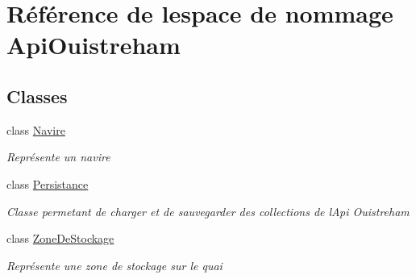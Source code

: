 \hypertarget{namespace_api_ouistreham}{}\section{Référence de l\textquotesingle{}espace de nommage Api\+Ouistreham}
\label{namespace_api_ouistreham}
\subsection*{Classes}
\begin{DoxyCompactItemize}
\item 
class \hyperlink{class_api_ouistreham_1_1_navire}{Navire}
\begin{DoxyCompactList}\small\item\em Représente un navire \end{DoxyCompactList}\item 
class \hyperlink{class_api_ouistreham_1_1_persistance}{Persistance}
\begin{DoxyCompactList}\small\item\em Classe permetant de charger et de sauvegarder des collections de l\textquotesingle{}Api Ouistreham \end{DoxyCompactList}\item 
class \hyperlink{class_api_ouistreham_1_1_zone_de_stockage}{Zone\+De\+Stockage}
\begin{DoxyCompactList}\small\item\em Représente une zone de stockage sur le quai \end{DoxyCompactList}\end{DoxyCompactItemize}
